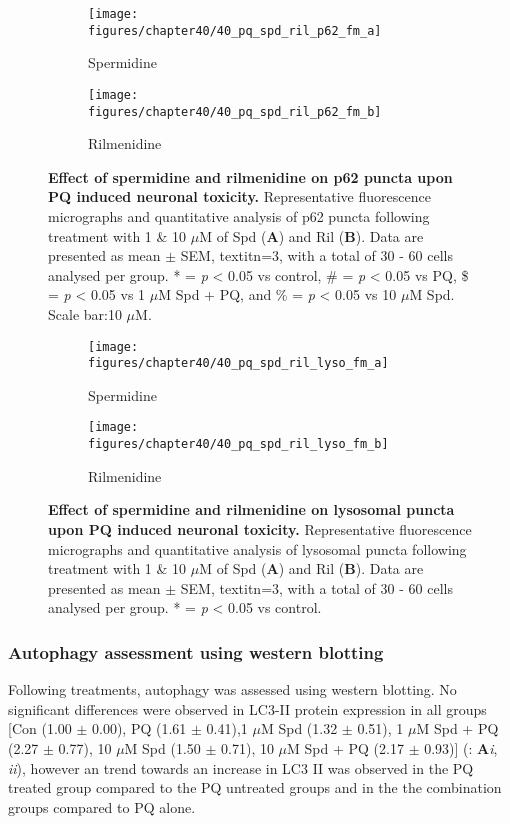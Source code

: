 \begin{figure}[!htbp]
  \center
  \begin{subfigure}[b]{0.495\linewidth}
    \texttt{[image: figures/chapter40/40\_pq\_spd\_ril\_p62\_fm\_a]}
    \caption{Spermidine}
  \end{subfigure}
  \begin{subfigure}[b]{0.495\linewidth}
    \texttt{[image: figures/chapter40/40\_pq\_spd\_ril\_p62\_fm\_b]}
    \caption{Rilmenidine}
  \end{subfigure}
  \caption[Effect of spermidine and rilmenidine on p62 puncta upon PQ induced neuronal toxicity]{\textbf{Effect of spermidine and rilmenidine on p62 puncta upon PQ induced neuronal toxicity.} Representative fluorescence micrographs and quantitative analysis of p62 puncta following treatment with 1 \& 10 $\mu$M of Spd (\textbf{A}) and Ril (\textbf{B}). Data are presented as mean $\pm$ SEM, textit{n}=3, with a total of 30 - 60 cells analysed per group. * = \textit{p} < 0.05 vs control, \# = \textit{p} < 0.05 vs PQ, \$ = \textit{p} < 0.05 vs 1 $\mu$M Spd + PQ, and \% = \textit{p} < 0.05 vs 10 $\mu$M Spd. Scale bar:10 $\mu$M.}
  \label{fig:40_pq_spd_ril_p62_fm_a}
\end{figure}

\begin{figure}[!htbp]
  \center
  \begin{subfigure}[b]{0.495\linewidth}
    \texttt{[image: figures/chapter40/40\_pq\_spd\_ril\_lyso\_fm\_a]}
    \caption{Spermidine}
  \end{subfigure}
  \begin{subfigure}[b]{0.495\linewidth}
    \texttt{[image: figures/chapter40/40\_pq\_spd\_ril\_lyso\_fm\_b]}
    \caption{Rilmenidine}
  \end{subfigure}
  \caption[Effect of spermidine and rilmenidine on lysosomal puncta upon PQ induced neuronal toxicity]{\textbf{Effect of spermidine and rilmenidine on lysosomal puncta upon PQ induced neuronal toxicity.} Representative fluorescence micrographs and quantitative analysis of lysosomal puncta following treatment with 1 \& 10 $\mu$M of Spd (\textbf{A}) and Ril (\textbf{B}). Data are presented as mean $\pm$ SEM, textit{n}=3, with a total of 30 - 60 cells analysed per group. * = \textit{p} < 0.05 vs control.}
  \label{fig:40_pq_spd_ril_lyso_fm_a}
\end{figure}

\subsubsection{Autophagy assessment using western blotting}
Following treatments, autophagy was assessed using western blotting. No significant differences were observed in LC3-II protein expression in all groups [Con (1.00 $\pm$ 0.00), PQ (1.61 $\pm$ 0.41),1 $\mu$M Spd (1.32 $\pm$ 0.51), 1 $\mu$M Spd + PQ (2.27 $\pm$ 0.77), 10 $\mu$M Spd (1.50 $\pm$ 0.71), 10 $\mu$M Spd + PQ (2.17 $\pm$ 0.93)] (: \textbf{A}\textit{i}, \textit{ii}), however an trend towards an increase in LC3 II was observed in the PQ treated group compared to the PQ untreated groups and in the the combination groups compared to PQ alone.

